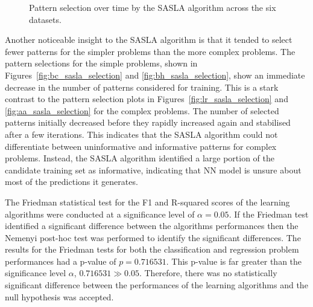 \documentclass[conference]{IEEEtran}
\begin{document}
\begin{figure}[htbp]
		\hfil
		\caption{Pattern selection over time by the SASLA algorithm across the six datasets.}
		\label{fig:sasla_selection_all}
	\end{figure}
	
	Another noticeable insight to the SASLA algorithm is that it tended to select fewer patterns for the simpler problems than the more complex problems. The pattern selections for the simple problems, shown in Figures~\ref{fig:bc_sasla_selection} and \ref{fig:bh_sasla_selection}, show an immediate decrease in the number of patterns considered for training. This is a stark contrast to the pattern selection plots in Figures~\ref{fig:lr_sasla_selection} and \ref{fig:aa_sasla_selection} for the complex problems. The number of selected patterns initially decreased before they rapidly increased again and stabilised after a few iterations. This indicates that the SASLA algorithm could not differentiate between uninformative and informative patterns for complex problems. Instead, the SASLA algorithm identified a large portion of the candidate training set as informative, indicating that NN model is unsure about most of the predictions it generates.
	
	The Friedman statistical test for the F1 and R-squared scores of the learning algorithms were conducted at a significance level of $\alpha=0.05$. If the Friedman test identified a significant difference between the algorithms performances then the Nemenyi post-hoc test was performed to identify the significant differences. The results for the Friedman tests for both the classification and regression problem performances had a p-value of $p=0.716531$. This p-value is far greater than the significance level $\alpha$, $0.716531 \gg 0.05$. Therefore, there was no statistically significant difference between the performances of the learning algorithms and the null hypothesis was accepted. 
	
\end{document}
